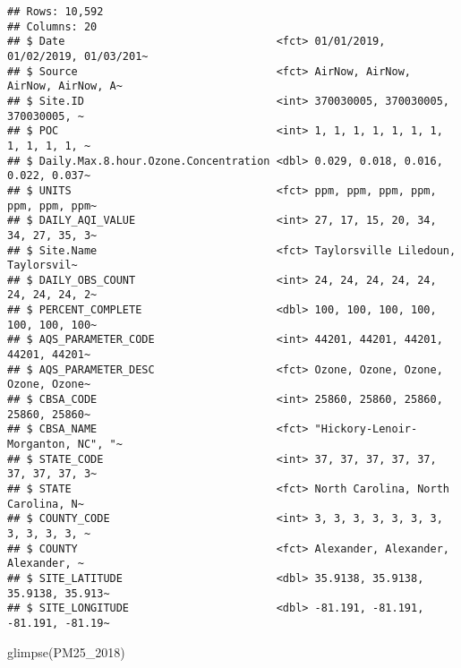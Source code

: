 \documentclass[
]{article}
\newenvironment{Shaded}{\begin{snugshade}}{\end{snugshade}}
\newcommand{\FunctionTok}[1]{\textcolor[rgb]{0.00,0.00,0.00}{#1}}
\newcommand{\NormalTok}[1]{#1}
\begin{document}
\begin{verbatim}
## Rows: 10,592
## Columns: 20
## $ Date                                 <fct> 01/01/2019, 01/02/2019, 01/03/201~
## $ Source                               <fct> AirNow, AirNow, AirNow, AirNow, A~
## $ Site.ID                              <int> 370030005, 370030005, 370030005, ~
## $ POC                                  <int> 1, 1, 1, 1, 1, 1, 1, 1, 1, 1, 1, ~
## $ Daily.Max.8.hour.Ozone.Concentration <dbl> 0.029, 0.018, 0.016, 0.022, 0.037~
## $ UNITS                                <fct> ppm, ppm, ppm, ppm, ppm, ppm, ppm~
## $ DAILY_AQI_VALUE                      <int> 27, 17, 15, 20, 34, 34, 27, 35, 3~
## $ Site.Name                            <fct> Taylorsville Liledoun, Taylorsvil~
## $ DAILY_OBS_COUNT                      <int> 24, 24, 24, 24, 24, 24, 24, 24, 2~
## $ PERCENT_COMPLETE                     <dbl> 100, 100, 100, 100, 100, 100, 100~
## $ AQS_PARAMETER_CODE                   <int> 44201, 44201, 44201, 44201, 44201~
## $ AQS_PARAMETER_DESC                   <fct> Ozone, Ozone, Ozone, Ozone, Ozone~
## $ CBSA_CODE                            <int> 25860, 25860, 25860, 25860, 25860~
## $ CBSA_NAME                            <fct> "Hickory-Lenoir-Morganton, NC", "~
## $ STATE_CODE                           <int> 37, 37, 37, 37, 37, 37, 37, 37, 3~
## $ STATE                                <fct> North Carolina, North Carolina, N~
## $ COUNTY_CODE                          <int> 3, 3, 3, 3, 3, 3, 3, 3, 3, 3, 3, ~
## $ COUNTY                               <fct> Alexander, Alexander, Alexander, ~
## $ SITE_LATITUDE                        <dbl> 35.9138, 35.9138, 35.9138, 35.913~
## $ SITE_LONGITUDE                       <dbl> -81.191, -81.191, -81.191, -81.19~
\end{verbatim}

\begin{Shaded}
\begin{Highlighting}[]
\FunctionTok{glimpse}\NormalTok{(PM25\_2018)}
\end{Highlighting}
\end{Shaded}
\end{document}
